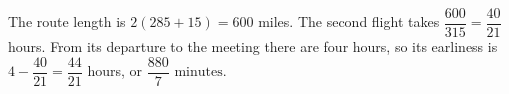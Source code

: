 The route length is $ 2(285+15)=600 $ miles. The second flight takes $\dfrac{600}{315}=\dfrac{40}{21}$ hours. From its departure to the meeting there are four hours, so its earliness is $ 4-\dfrac{40}{21}=\dfrac{44}{21}$ hours, or $\boxed{\dfrac{880}{7}\text{ minutes}}$.
